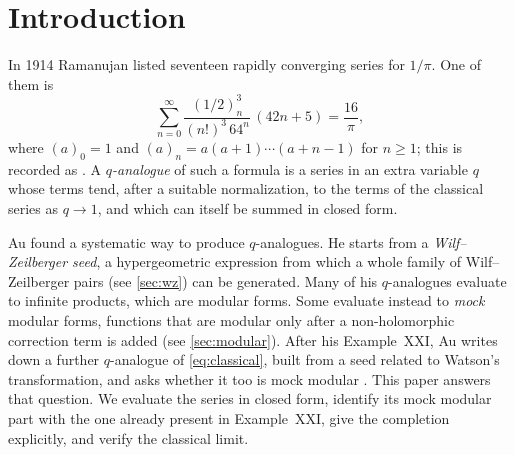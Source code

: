 \section{Introduction}\label{sec:intro}

In 1914 Ramanujan listed seventeen rapidly converging series for $1/\pi$.
One of them is
\begin{equation}\label{eq:classical}
\sum_{n=0}^{\infty}\frac{(1/2)_n^3}{(n!)^3\,64^n}\,(42n+5)=\frac{16}{\pi},
\end{equation}
where $(a)_0=1$ and $(a)_n=a(a+1)\cdots(a+n-1)$ for $n\ge1$; this is recorded
as \cite[(1.3)]{Au}. A \emph{$q$-analogue} of such a formula is a series in an
extra variable $q$ whose terms tend, after a suitable normalization, to the
terms of the classical series as $q\to1$, and which can itself be summed in
closed form.

Au \cite{Au} found a systematic way to produce $q$-analogues. He starts from a
\emph{Wilf--Zeilberger seed}, a hypergeometric expression from which a whole
family of Wilf--Zeilberger pairs (see \cref{sec:wz}) can be generated. Many of
his $q$-analogues evaluate to infinite products, which are modular forms. Some
evaluate instead to \emph{mock} modular forms, functions that are modular only
after a non-holomorphic correction term is added (see \cref{sec:modular}).
After his Example~XXI, Au writes down a further $q$-analogue of
\eqref{eq:classical}, built from a seed related to Watson's transformation,
and asks whether it too is mock modular \cite[remark after Example~XXI]{Au}.
This paper answers that question. We evaluate the series in closed form,
identify its mock modular part with the one already present in Example~XXI,
give the completion explicitly, and verify the classical limit.

